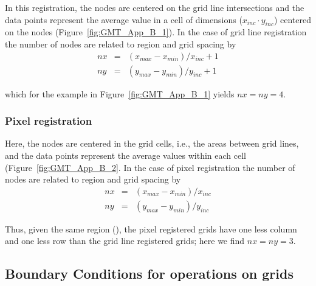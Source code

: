 In this registration, the nodes are centered on the grid line
intersections and the data points represent the average value
in a cell of dimensions ($x_{inc} \cdot y_{inc}$) centered on the
nodes (Figure~\ref{fig:GMT_App_B_1}).
In the case of grid line registration the number of nodes are
related to region and grid spacing by \\

\[ \begin{array}{ccl} 
nx & =  &       (x_{max} - x_{min}) / x_{inc} + 1       \\ 
ny & =  &       (y_{max} - y_{min}) / y_{inc} + 1
\end{array} \]

which for the example in Figure~\ref{fig:GMT_App_B_1} yields $nx = ny = 4$.



\subsubsection{Pixel registration}

Here, the nodes are centered in the grid cells, i.e., the areas
between grid lines, and the data points represent the average
values within each cell (Figure~\ref{fig:GMT_App_B_2}.
In the case of pixel registration the number of nodes are related
to region and grid spacing by \\

\[ \begin{array}{ccl} 
nx & =  &       (x_{max} - x_{min}) / x_{inc}   \\ 
ny & =  &       (y_{max} - y_{min}) / y_{inc}
\end{array} \]

Thus, given the same region (), the pixel registered grids have one less
column and one less row than the grid line registered grids; here we
find $nx = ny = 3$.



\subsection{Boundary Conditions for operations on grids} 

